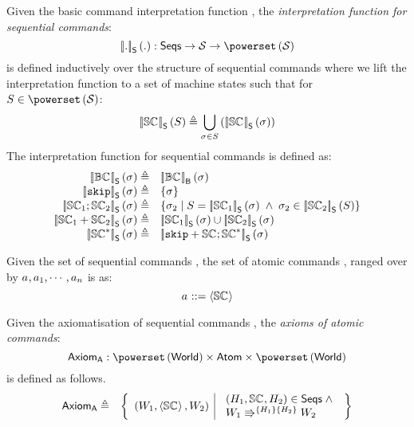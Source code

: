 \begin{definition}
Given the basic command interpretation function , the \emph{interpretation function for sequential commands}:
%
\[
	\opSemSeq{.}{.} : \Seqs \rightarrow \MStates \rightarrow \pset{\MStates}
\]
%
is defined inductively over the structure of sequential commands where we lift the interpretation function to a set of machine states such that for $S \in \pset{\MStates}$:
%
\[
	\opSemSeq{\seq{}}{S} \eqdef \bigcup\limits_{\ms{} \in S} \left( \opSemSeq{\seq{}}{\ms{}}\right)
\]
%
The interpretation function for sequential commands is defined as:
%
\[
\begin{array}{r l}
	\opSemSeq{\bc{}}{\ms{}} \eqdef & \opSemB{\bc{}}{\ms{}}\\
	
	\opSemSeq{\skipC}{\ms{}} \eqdef & \left\{\ms{} \right\}\\
	
	\opSemSeq{\seq{1} ; \seq{2}}{\ms{}} \eqdef & 
	\left\{
		\ms{2} \;|\;
		S = \opSemSeq{\seq{1}}{\ms{}} \;\land\;  \ms{2} \in \opSemSeq{\seq{2}}{S} 
	\right\}\\
	
	\opSemSeq{\seq{1} + \seq{2}}{\ms{}} \eqdef & \opSemSeq{\seq{1}}{\ms{}} \cup \opSemSeq{\seq{2}}{\ms{}}\\
	
	\opSemSeq{\seq{}^{*}}{\ms{}} \eqdef & 
	\opSemSeq{\skipC + \seq{}; \seq{}^{*}}{\ms{}}
\end{array} 
\]
%
\end{definition}
%
%
\begin{definition}
Given the set of sequential commands \Seqs, the set of atomic commands \Atoms, ranged over by $\atom{}, \atom{1}, \cdots, \atom{n}$ is as:
%
\[
	\atom{} ::= \atomic{\seq{}}
\]
%
\end{definition}
%
%
\begin{definition}
Given the axiomatisation of sequential commands \AxiomsSeq, the \emph{axioms of atomic commands}:
%
\[
	\AxiomsA : \pset{\Worlds} \times \Atoms \times \pset{\Worlds}
\]
%
is defined as follows.
%
\[
\begin{array}{r l}

	\AxiomsA \eqdef & 
	\left\{ 
	\begin{array}{l | l}
		\left(W_1, \atomic{\seq{}}, W_2 \right)	& 
		\begin{array}{l}
			\left(H_1, \seq{}, H_2 \right) \in \Seqs \;\land\\ 
			\repartitions{W_1}{W_2}{H_1}{H_2}	
		\end{array}
	\end{array}
	\right\}
	
\end{array}
\]
%
\end{definition}
